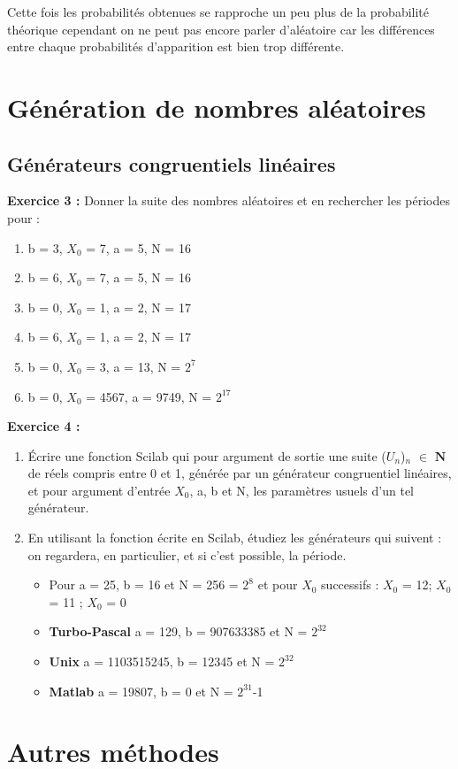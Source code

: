 \documentclass{book}
\begin{document}
Cette fois les probabilités obtenues se rapproche un peu plus de la probabilité théorique cependant on ne peut pas encore parler d'aléatoire car les différences entre chaque probabilités d'apparition est bien trop différente.
\section{Génération de nombres aléatoires}
\subsection{Générateurs congruentiels linéaires}
\textbf{Exercice 3 :}
Donner la suite des nombres aléatoires et en rechercher les périodes pour : 
\begin{enumerate}
	\item b = 3, $X_0$ = 7, a = 5, N = 16 
	\item b = 6, $X_0$ = 7, a = 5, N = 16 
	\item b = 0, $X_0$ = 1, a = 2, N = 17 
	\item b = 6, $X_0$ = 1, a = 2, N = 17 
	\item b = 0, $X_0$ = 3, a = 13, N = $2^7$ 
	\item b = 0, $X_0$ = 4567, a = 9749, N = $2^{17}$ 
\end{enumerate}
\textbf{Exercice 4 :}
\begin{enumerate}
	\item Écrire une fonction Scilab qui pour argument de sortie une suite ($U_{n}$)$_{n}$ $\in$ $\mathbf{N}$ de réels compris entre 0 et 1, générée par un générateur congruentiel linéaires, et pour argument d'entrée $X_0$, a, b et N, les paramètres usuels d'un tel générateur.
	\item En utilisant la fonction écrite en Scilab, étudiez les générateurs qui suivent : on regardera, en particulier, et si c'est possible, la période.
	\begin{itemize}
		\item Pour a = 25, b = 16 et N = 256 = $2^8$ et pour $X_0$ successifs : $X_0$ = 12; $X_0$ = 11 ; $X_0$ = 0
		\item \textbf{Turbo-Pascal} a = 129, b = 907633385 et N = $2^{32}$
		\item \textbf{Unix} a = 1103515245, b = 12345 et N = $2^{32}$
		\item \textbf{Matlab} a = 19807, b = 0 et N = $2^{31}$-1
	\end{itemize}
\end{enumerate}
\section{Autres méthodes}
\end{document}
